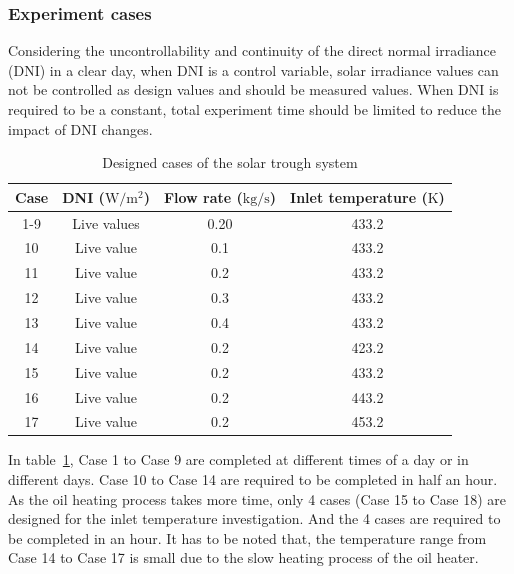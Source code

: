 \subsubsection{Experiment cases}


Considering the uncontrollability and continuity of the direct normal irradiance (DNI) in a clear day, when DNI is a control variable, solar irradiance values can not be controlled as design values and should be measured values. When DNI is required to be a constant, total experiment time should be limited to reduce the impact of DNI changes.

\begin{table}[htbp]\footnotesize
	\caption{Designed cases of the solar trough system}
	\begin{center}
	\begin{tabular}{cccc}
		\toprule
		Case	& DNI ($\mathrm{W/m^2}$)	&	Flow rate ($\mathrm{kg/s}$)			&	Inlet temperature ($\mathrm{K}$)\\
		\midrule
		1-9	&	Live values	&	0.20	&	433.2\\
		10	&	Live value	&	0.1	&	433.2\\
		11	&	Live value	&	0.2	&	433.2\\
		12	&	Live value	&	0.3	&	433.2\\
		13	&	Live value	&	0.4	&	433.2\\
		14	&	Live value	&	0.2	&	423.2\\
		15	&	Live value	&	0.2	&	433.2\\
		16	&	Live value	&	0.2	&	443.2\\
		17	&	Live value	&	0.2	&	453.2\\
		\bottomrule
	\end{tabular}
	\end{center}
	\label{tab:DesignedCasesForTrough}
\end{table}

In table~\ref{tab:DesignedCasesForTrough}, Case 1 to Case 9 are completed at different times of a day or in different days. Case 10 to Case 14 are required to be completed in half an hour. As the oil heating process takes more time, only 4 cases (Case 15 to Case 18) are designed for the inlet temperature investigation. And the 4 cases are required to be completed in an hour. It has to be noted that, the temperature range from Case 14 to Case 17 is small due to the slow heating process of the oil heater.

